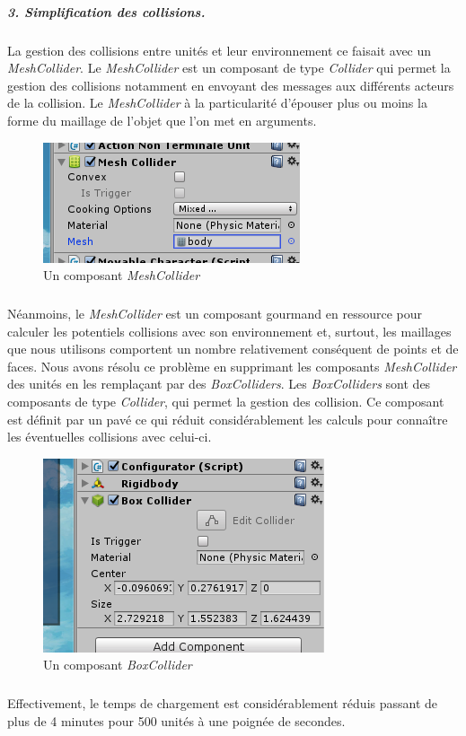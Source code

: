 \documentclass{report}
\begin{document}
\subparagraph{3. Simplification des collisions.} La gestion des collisions entre unités et leur environnement ce faisait avec un \textit{MeshCollider}. Le \textit{MeshCollider} est un composant de type \textit{Collider} qui permet la gestion des collisions notamment en envoyant des messages aux différents acteurs de la collision. Le \textit{MeshCollider} à la particularité d'épouser plus ou moins la forme du maillage de l'objet que l'on met en arguments.
\begin{figure}[!h]
\centering
\includegraphics{MeshColliderImage}
\caption{Un composant \textit{MeshCollider}}
\end{figure}
\subparagraph{}Néanmoins, le \textit{MeshCollider} est un composant gourmand en ressource pour calculer les potentiels collisions avec son environnement et, surtout, les maillages que nous utilisons comportent un nombre relativement conséquent de points et de faces. Nous avons résolu ce problème en supprimant les composants \textit{MeshCollider} des unités en les remplaçant par des  \textit{BoxColliders}. Les \textit{BoxColliders} sont des composants de type \textit{Collider}, qui permet la gestion des collision. Ce composant est définit par un pavé ce qui réduit considérablement les calculs pour connaître les éventuelles collisions avec celui-ci.

\begin{figure}[!h]
\centering
\includegraphics{BoxColliderImage}
\caption{Un composant \textit{BoxCollider}}
\end{figure}

\subparagraph{}Effectivement, le temps de chargement est considérablement réduis passant de plus de 4 minutes pour 500 unités à une poignée de secondes.
\end{document}
